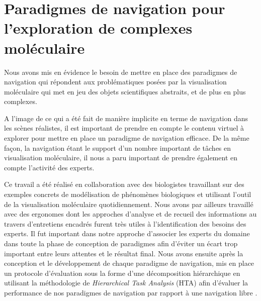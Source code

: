 \section{Paradigmes de navigation pour l'exploration de complexes moléculaire}

Nous avons mis en évidence le besoin de mettre en place des paradigmes de navigation qui répondent aux problématiques posées par la visualisation moléculaire qui met en jeu des objets scientifiques abstraits, et de plus en plus complexes.



A l'image de ce qui a été fait de manière implicite en terme de navigation dans les scènes réalistes, il est  important de prendre en compte le contenu virtuel à explorer pour mettre en place un paradigme de navigation efficace. De la même façon, la navigation étant le support d'un nombre important de tâches en visualisation moléculaire, il nous a paru important de prendre également en compte l'activité des experts. 


Ce travail a été réalisé en collaboration avec des biologistes travaillant sur des exemples concrets de modélisation de phénomènes biologiques et utilisant l'outil de la visualisation moléculaire quotidiennement. Nous avons par ailleurs travaillé avec des ergonomes dont les approches d'analyse et de recueil des informations au travers d'entretiens encadrés furent très utiles à l'identification des besoins des experts. Il fut important dans notre approche d'associer les experts du domaine dans toute la phase de conception de paradigmes afin d'éviter un écart trop important entre leurs attentes et le résultat final. Nous avons ensuite après la conception et le développement de chaque paradigme de navigation, mis en place un protocole d'évaluation sous la forme d'une décomposition hiérarchique en utilisant la méthodologie de \textit{Hierarchical Task Analysis} (HTA) afin d'évaluer la performance de nos paradigmes de navigation par rapport à une navigation libre \cite{annett2003hierarchical}.

